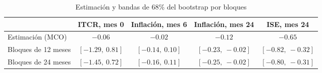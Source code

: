 \begin{table}[H]
\centering
\caption{Estimación y bandas de 68\% del bootstrap por bloques}
\label{tab:D_bandas_bloques}
\small
\begin{tabular}{@{}lcccc@{}}
\toprule
 & ITCR, mes 0 & Inflación, mes 6 & Inflación, mes 24 & ISE, mes 24 \\
\midrule
Estimación (MCO) & $-0.06$ & $-0.02$ & $-0.12$ & $-0.65$ \\
Bloques de 12 meses & $[-1.29,\ 0.81]$ & $[-0.14,\ 0.10]$ & $[-0.23,\ -0.02]$ & $[-0.82,\ -0.32]$ \\
Bloques de 24 meses & $[-1.45,\ 0.72]$ & $[-0.16,\ 0.11]$ & $[-0.25,\ -0.02]$ & $[-0.80,\ -0.31]$ \\
\bottomrule
\end{tabular}
\end{table}
